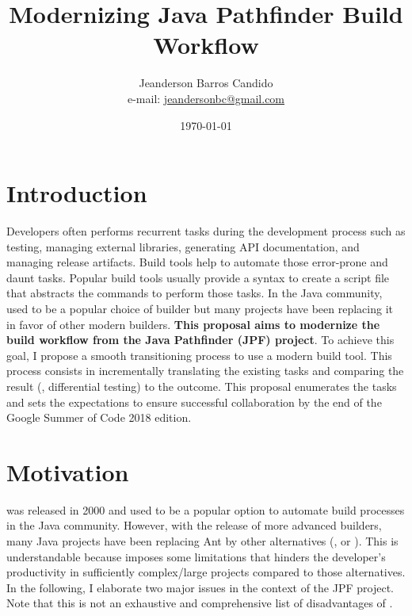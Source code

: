 \documentclass[a4paper, 12pt]{article}
\author{Jeanderson Barros Candido\\e-mail: \url{jeandersonbc@gmail.com}}
\title{Modernizing Java Pathfinder Build Workflow}
\date{\today}
\begin{document}
\maketitle

\section*{Introduction}

Developers often performs recurrent tasks during the development process such
as testing, managing external libraries, generating API documentation, and
managing release artifacts.
Build tools help to automate those error-prone and daunt tasks.
Popular build tools usually provide a syntax to create a script file that
abstracts the commands to perform those tasks.
In the Java community, \ant{} used to be a popular choice of builder but many
projects have been replacing it in favor of other modern builders.
\textbf{This proposal aims to modernize the build workflow from the Java
Pathfinder (JPF) project}.
To achieve this goal, I propose a smooth transitioning process to use a modern
build tool.
This process consists in incrementally translating the existing \ant{} tasks
and comparing the result (\ie, differential testing) to the \ant{} outcome.
This proposal enumerates the tasks and sets the expectations to ensure
successful collaboration by the end of the Google Summer of Code 2018 edition.

\section{Motivation}
\label{sec:motivation}

\ant{}\cite{page:ant} was released in 2000 and used to be a popular option to automate
build processes in the Java community.
However, with the release of more advanced builders, many Java projects have
been replacing Ant by other alternatives (\eg, \gradle{}\cite{page:gradle} or
\maven{}\cite{page:maven}).
This is understandable because \ant{} imposes some limitations that hinders the
developer's productivity in sufficiently complex/large projects compared to
those alternatives.
In the following, I elaborate two major issues in the context of the JPF
project.
Note that this is not an exhaustive and comprehensive list of disadvantages of
\ant{}.
\end{document}
